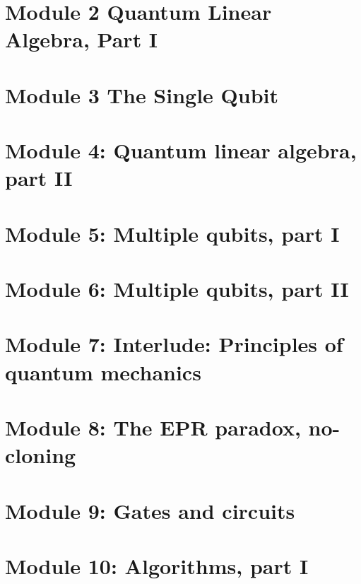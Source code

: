 \section{Module 2 Quantum Linear Algebra, Part I}


\section{Module 3 The Single Qubit}



\section{Module 4: Quantum linear algebra, part II}



\section{Module 5: Multiple qubits, part I}


\section{Module 6: Multiple qubits, part II}


\section{Module 7: Interlude: Principles of quantum mechanics}


\section{Module 8: The EPR paradox, no-cloning}


\section{Module 9: Gates and circuits}


\section{Module 10: Algorithms, part I}


